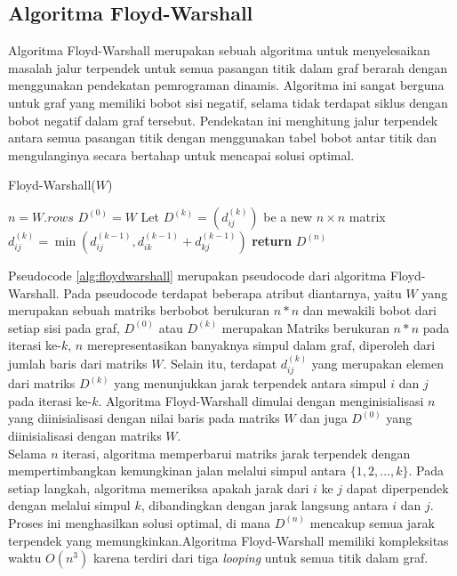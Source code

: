 \subsection{Algoritma Floyd-Warshall ~\cite{Cormen:09:intro}}
\label{floydwarshall}
Algoritma Floyd-Warshall merupakan sebuah algoritma untuk menyelesaikan masalah jalur terpendek untuk semua pasangan titik dalam graf berarah dengan menggunakan pendekatan pemrograman dinamis. Algoritma ini sangat berguna untuk graf yang memiliki bobot sisi negatif, selama tidak terdapat siklus dengan bobot negatif dalam graf tersebut. Pendekatan ini menghitung jalur terpendek antara semua pasangan titik dengan menggunakan tabel bobot antar titik dan mengulanginya secara bertahap untuk mencapai solusi optimal.
\begin{algorithm}[H]
    \caption{Floyd-Warshall($W$)}
    \label{alg:floydwarshall}
    \begin{algorithmic}[1]
        \State $n = W.rows$
        \State $D^{(0)} = W$
            \State Let $D^{(k)} = (d_{ij}^{(k)})$ be a new $n \times n$ matrix
                    \State $d_{ij}^{(k)} = \min(d_{ij}^{(k-1)}, d_{ik}^{(k-1)} + d_{kj}^{(k-1)})$
                \EndFor
            \EndFor
        \EndFor
        \State \textbf{return} $D^{(n)}$
    \end{algorithmic}
\end{algorithm}
\noindent
Pseudocode \ref{alg:floydwarshall} merupakan pseudocode dari algoritma Floyd-Warshall. Pada pseudocode terdapat beberapa atribut diantarnya, yaitu $W$ yang merupakan sebuah matriks berbobot berukuran $n*n$ dan mewakili bobot dari setiap sisi pada graf, $D^{(0)}$ atau $D^{(k)}$ merupakan Matriks berukuran $n*n$ pada iterasi ke-$k$, $n$ merepresentasikan banyaknya simpul dalam graf, diperoleh dari jumlah baris dari matriks $W$. Selain itu, terdapat $d_{ij}^{(k)}$ yang merupakan elemen dari matriks $D^{(k)}$ yang menunjukkan jarak terpendek antara simpul $i$ dan $j$ pada iterasi ke-$k$. Algoritma Floyd-Warshall dimulai dengan menginisialisasi $n$ yang diinisialisasi dengan nilai baris pada matriks $W$ dan juga $D^{(0)}$ yang diinisialisasi dengan matriks $W$. 
\\
Selama $n$ iterasi, algoritma memperbarui matriks jarak terpendek dengan mempertimbangkan kemungkinan jalan melalui simpul antara $\{1,2,...,k\}$. Pada setiap langkah, algoritma memeriksa apakah jarak dari $i$ ke $j$ dapat diperpendek dengan melalui simpul $k$, dibandingkan dengan jarak langsung antara $i$ dan $j$. Proses ini menghasilkan solusi optimal, di mana $D^{(n)}$ mencakup semua jarak terpendek yang memungkinkan.Algoritma Floyd-Warshall memiliki kompleksitas waktu $O(n^3)$ karena terdiri dari tiga \textit{looping} untuk semua titik dalam graf.
